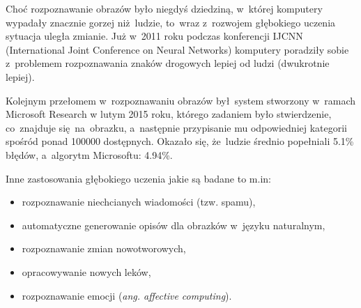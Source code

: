 Choć rozpoznawanie obrazów było niegdyś dziedziną, w~której komputery wypadały
znacznie gorzej niż~ludzie, to~wraz z~rozwojem głębokiego uczenia sytuacja
uległa zmianie. Już w~2011 roku podczas konferencji IJCNN (International Joint
Conference on Neural Networks) komputery poradziły sobie z~problemem
rozpoznawania znaków drogowych lepiej od ludzi (dwukrotnie lepiej).

Kolejnym przełomem w~rozpoznawaniu obrazów był~system stworzony w~ramach
Microsoft Research w lutym 2015 roku, którego zadaniem było stwierdzenie,
co~znajduje się~na~obrazku, a~następnie przypisanie mu odpowiedniej kategorii spośród
ponad 100000 dostępnych. Okazało się, że~ludzie średnio popełniali 5.1\% błędów,
a~algorytm Microsoftu: 4.94\%.

Inne zastosowania głębokiego uczenia jakie są badane to m.in:
\begin{itemize}
  \item rozpoznawanie niechcianych wiadomości (tzw. spamu),
  \item automatyczne generowanie opisów dla obrazków w~języku naturalnym,
  \item rozpoznawanie zmian nowotworowych,
  \item opracowywanie nowych leków,
  \item rozpoznawanie emocji (\textit{ang. affective computing}).
\end{itemize}